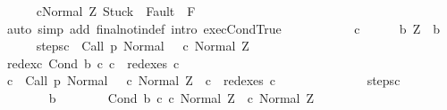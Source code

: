 \begin{isabellebody}
\ \ \ \ \isamarkupfalse%
\ {\isachardoublequoteopen}{\isasymGamma}{\isasymturnstile}{\isasymlangle}c{}{\isacharcomma}Normal\ Z{\isasymrangle}\ {\isasymRightarrow}{\isasymnotin}{\isacharparenleft}{\isacharbraceleft}Stuck{\isacharbraceright}\ {\isasymunion}\ Fault\ {\isacharbackquote}\ {\isacharparenleft}{\isacharminus}F{\isacharparenright}{\isacharparenright}{\isachardoublequoteclose}\isanewline
\ \ \ \ \ \ \isamarkupfalse%
\ {\isacharparenleft}auto\ simp\ add{\isacharcolon}\ final{\isacharunderscore}notin{\isacharunderscore}def\ intro{\isacharcolon}\ exec{\isachardot}CondTrue{\isacharparenright}\isanewline
\ \ \isamarkupfalse%
\ \ \isanewline
\ \ \ \ \isamarkupfalse%
\ c{\isacharprime}\isanewline
\ \ \ \ \isamarkupfalse%
\ b{\isacharcolon}\ {\isachardoublequoteopen}Z\ {\isasymin}\ b{\isachardoublequoteclose}\ \isanewline
\ \ \ \ \isamarkupfalse%
\ steps{\isacharunderscore}c{\isacharprime}{\isacharcolon}\ {\isachardoublequoteopen}{\isasymGamma}{\isasymturnstile}\ {\isacharparenleft}Call\ p{\isacharcomma}\ Normal\ {\isasymsigma}{\isacharparenright}\ {\isasymrightarrow}\isactrlsup {\isacharplus}\ {\isacharparenleft}c{\isacharprime}{\isacharcomma}\ Normal\ Z{\isacharparenright}{\isachardoublequoteclose}\isanewline
\ \ \ \ \isamarkupfalse%
\ redex{\isacharunderscore}c{\isacharprime}{\isacharcolon}\ {\isachardoublequoteopen}Cond\ b\ c{}\ c{}\ {\isasymin}\ redexes\ c{\isacharprime}{\isachardoublequoteclose}\isanewline
\ \ \ \ \isamarkupfalse%
\ {\isachardoublequoteopen}{\isasymexists}c{\isacharprime}{\isachardot}\ {\isasymGamma}{\isasymturnstile}\ {\isacharparenleft}Call\ p{\isacharcomma}\ Normal\ {\isasymsigma}{\isacharparenright}\ {\isasymrightarrow}\isactrlsup {\isacharplus}\ {\isacharparenleft}c{\isacharprime}{\isacharcomma}\ Normal\ Z{\isacharparenright}\ {\isasymand}\ c{}\ {\isasymin}\ redexes\ c{\isacharprime}{\isachardoublequoteclose}\isanewline
\ \ \ \ \isamarkupfalse%
\ {\isacharminus}\isanewline
\ \ \ \ \ \ \isamarkupfalse%
\ steps{\isacharunderscore}c{\isacharprime}\isanewline
\ \ \ \ \ \ \isamarkupfalse%
\isanewline
\ \ \ \ \ \ \isamarkupfalse%
\ b\isanewline
\ \ \ \ \ \ \isamarkupfalse%
\ {\isachardoublequoteopen}{\isasymGamma}{\isasymturnstile}{\isacharparenleft}Cond\ b\ c{}\ c{}{\isacharcomma}\ Normal\ Z{\isacharparenright}\ {\isasymrightarrow}\ {\isacharparenleft}c{}{\isacharcomma}\ Normal\ Z{\isacharparenright}{\isachardoublequoteclose}\isanewline

\end{isabellebody}
